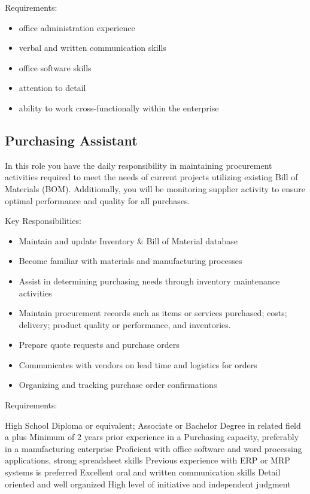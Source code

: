 Requirements:
\begin{itemize}
 \item office administration experience
 \item verbal and written communication skills
 \item office software skills
 \item attention to detail
 \item ability to work cross-functionally within the enterprise
\end{itemize}

\subsection{Purchasing Assistant}
In this role you have the daily responsibility in maintaining procurement activities required to meet the needs of current projects utilizing existing Bill of Materials (BOM). Additionally, you will be monitoring supplier activity to ensure optimal performance and quality for all purchases.
 
Key Responsibilities: 

\begin{itemize}
 \item Maintain and update Inventory \& Bill of Material database
 \item Become familiar with materials and manufacturing processes
 \item Assist in determining purchasing needs through inventory maintenance activities
 \item Maintain procurement records such as items or services purchased; costs; delivery; product quality or performance, and inventories.
 \item Prepare quote requests and purchase orders
 \item Communicates with vendors on lead time and logistics for orders
 \item Organizing and tracking purchase order confirmations
\end{itemize}

Requirements:

High School Diploma or equivalent; Associate or Bachelor Degree in related field a plus
Minimum of 2 years prior experience in a Purchasing capacity, preferably in a manufacturing enterprise
Proficient with office software and word processing applications, strong spreadsheet skills 
Previous experience with ERP or MRP systems is preferred
Excellent oral and written communication skills
Detail oriented and well organized
High level of initiative and independent judgment

